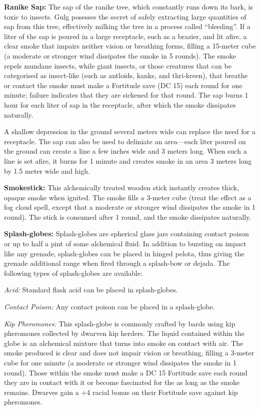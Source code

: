 \textbf{Ranike Sap:} The sap of the ranike tree, which constantly runs down its bark, is toxic to insects. Gulg posesses the secret of safely extracting large quantities of sap from this tree, effectively milking the tree in a process called ``bleeding''. If a liter of the sap is poured in a large receptacle, such as a brazier, and lit afire, a clear smoke that impairs neither vision or breathing forms, filling a 15-meter cube (a moderate or stronger wind dissipates the smoke in 5 rounds). The smoke repels mundane insects, while giant insects, or those creatures that can be categorised as insect-like (such as antloids, kanks, and thri-kreen), that breathe or contact the smoke must make a Fortitude save (DC 15) each round for one minute; failure indicates that they are sickened for that round. The sap burns 1 hour for each liter of sap in the receptacle, after which the smoke dissipates naturally.

A shallow depression in the ground several meters wide can replace the need for a receptacle. The sap can also be used to deliniate an area---each liter poured on the ground can create a line a few inches wide and 3 meters long. When such a line is set afire, it burns for 1 minute and creates smoke in an area 3 meters long by 1.5 meter wide and high.

\textbf{Smokestick:} This alchemically treated wooden stick instantly creates thick, opaque smoke when ignited. The smoke fills a 3-meter cube (treat the effect as a fog cloud spell, except that a moderate or stronger wind dissipates the smoke in 1 round). The stick is consumed after 1 round, and the smoke dissipates naturally.

\textbf{Splash-globes:} Splash-globes are spherical glass jars containing contact poison or up to half a pint of some alchemical fluid. In addition to bursting on impact like any grenade, splash-globes can be placed in hinged pelota, thus giving the grenade additional range when fired through a splash-bow or dejada. The following types of splash-globes are available:

 \textit{Acid:} Standard flask acid can be placed in splash-globes.

 \textit{Contact Poison:} Any contact poison can be placed in a splash-globe.

 \textit{Kip Pheromones:} This splash-globe is commonly crafted by bards using kip pheromones collected by dwarven kip herders. The liquid contained within the globe is an alchemical mixture that turns into smoke on contact with air. The smoke produced is clear and does not impair vision or breathing, filling a 3-meter cube for one minute (a moderate or stronger wind dissipates the smoke in 1 round). Those within the smoke must make a DC 15 Fortitude save each round they are in contact with it or become fascinated for the as long as the smoke remains. Dwarves gain a +4 racial bonus on their Fortitude save against kip pheromones.


